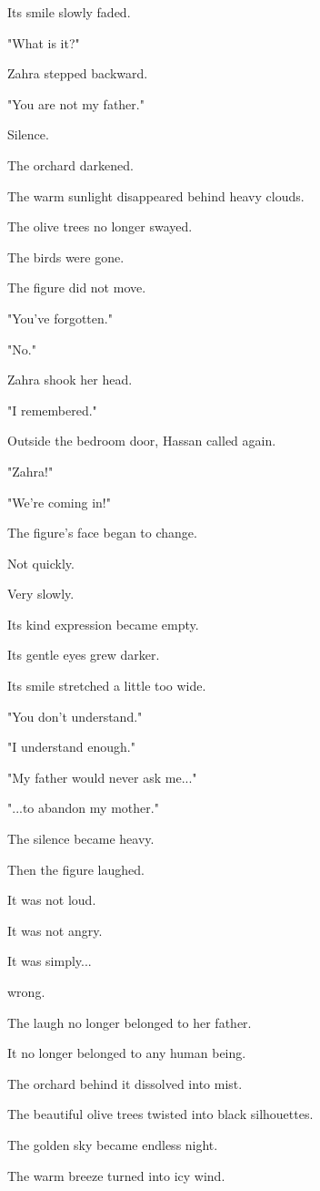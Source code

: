 \documentclass[12pt,openany]{book}
\begin{document}
Its smile slowly faded.

"What is it?"

Zahra stepped backward.

"You are not my father."

Silence.

The orchard darkened.

The warm sunlight disappeared behind heavy clouds.

The olive trees no longer swayed.

The birds were gone.

The figure did not move.

"You've forgotten."

"No."

Zahra shook her head.

"I remembered."

Outside the bedroom door, Hassan called again.

"Zahra!"

"We're coming in!"

The figure's face began to change.

Not quickly.

Very slowly.

Its kind expression became empty.

Its gentle eyes grew darker.

Its smile stretched a little too wide.

"You don't understand."

"I understand enough."

"My father would never ask me..."

"...to abandon my mother."

The silence became heavy.

Then the figure laughed.

It was not loud.

It was not angry.

It was simply...

wrong.

The laugh no longer belonged to her father.

It no longer belonged to any human being.

The orchard behind it dissolved into mist.

The beautiful olive trees twisted into black silhouettes.

The golden sky became endless night.

The warm breeze turned into icy wind.
\end{document}
